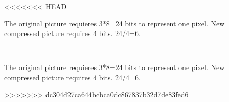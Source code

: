 <<<<<<< HEAD
\begin{answer}
The original picture requieres 3*8=24 bits to represent one pixel. New compressed picture requires 4 bits. 24/4=6.
\end{answer}
=======
\begin{answer}
The original picture requieres 3*8=24 bits to represent one pixel. New compressed picture requires 4 bits. 24/4=6.
\end{answer}
>>>>>>> dc304d27ca644bcbca0dc867837b32d7de83fed6
